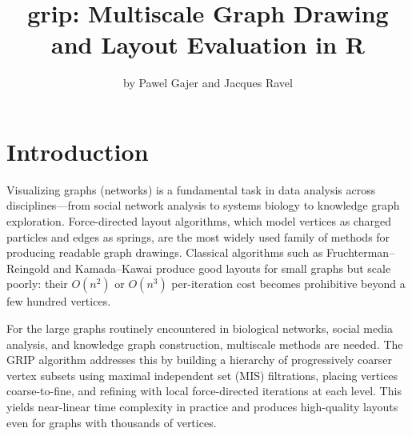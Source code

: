 \title{grip: Multiscale Graph Drawing and Layout Evaluation in R}


\author{by Pawel Gajer and Jacques Ravel}

\maketitle


\section{Introduction}\label{sec:introduction}

Visualizing graphs (networks) is a fundamental task in data analysis
across disciplines---from social network analysis to systems biology to
knowledge graph exploration. Force-directed layout algorithms, which
model vertices as charged particles and edges as springs, are the most
widely used family of methods for producing readable graph drawings.
Classical algorithms such as Fruchterman--Reingold
\citep{fruchterman1991} and Kamada--Kawai \citep{kamada1989} produce good
layouts for small graphs but scale poorly: their $O(n^2)$ or $O(n^3)$
per-iteration cost becomes prohibitive beyond a few hundred vertices.

For the large graphs routinely encountered in biological networks, social
media analysis, and knowledge graph construction, multiscale methods are
needed. The GRIP algorithm \citep{gajer2002, gajer2004} addresses this by
building a hierarchy of progressively coarser vertex subsets using
maximal independent set (MIS) filtrations, placing vertices
coarse-to-fine, and refining with local force-directed iterations at each
level. This yields near-linear time complexity in practice and produces
high-quality layouts even for graphs with thousands of vertices.

